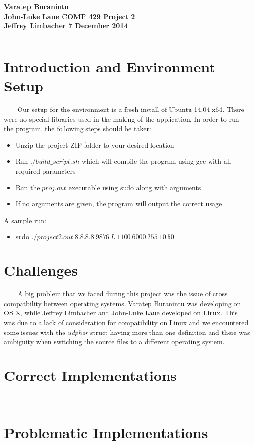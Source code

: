 \documentclass[11pt]{article}
\newcommand{\myname}{Project 2}
\newcommand{\course}{COMP 429}
\newcommand{\assignment}{Varatep Buranintu\\John-Luke Laue}
\newcommand{\probs}{Jeffrey Limbacher}
\newcommand{\duedate}{7 December 2014}
\newcommand{\mytitle}{
\begin{flushleft}
\bfseries
\assignment       \hspace*{\fill} \course \hspace*{\fill} \myname\\
\probs    \hspace*{\fill}                                 \duedate\\
\rule[10pt]{\linewidth}{1pt}
\end{flushleft}
}
\begin{document}
\thispagestyle{empty}   %
\mytitle                

\renewcommand{\qedsymbol}{}

\section{Introduction and Environment Setup}
\ \ \ \ Our setup for the environment is a fresh install of Ubuntu 14.04 x64. There were no special libraries used in the making of the application. In order to run the program, the following steps should be taken:\begin{itemize}
\item Unzip the project ZIP folder to your desired location
\item Run $./build\_script.sh$ which will compile the program using gcc with all required parameters
\item Run the $proj.out$ executable using sudo along with arguments
\item If no arguments are given, the program will output the correct usage
\end{itemize}
A sample run:
\begin{itemize}
\item sudo $./project2.out\ 8.8.8.8\ 9876\ L\ 1100\ 6000\ 255\ 10\ 50$
\end{itemize}

\section{Challenges}
\ \ \ \ A big problem that we faced during this project was the issue of cross compatbility between operating systems. Varatep Buranintu was developing on OS X, while Jeffrey Limbacher and John-Luke Laue developed on Linux. This was due to a lack of consideration for compatibility on Linux and we encountered some issues with the \textit{udphdr} struct having more than one definition and there was ambiguity when switching the source files to a different operating system. 

\section{Correct Implementations}
\ \ \ \ 

\section{Problematic Implementations}
\ \ \ \ 
\end{document}

